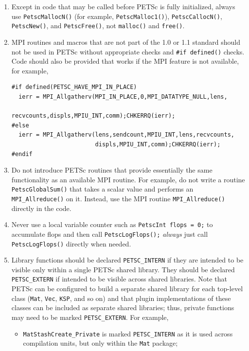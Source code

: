 \begin{enumerate}
\begin{lstlisting}
\end{lstlisting}
\item Except in code that may be called before PETSc is fully initialized, always use \lstinline{PetscMallocN()} (for example, \lstinline{PetscMalloc1()}), \lstinline{PetscCallocN()}, \lstinline{PetscNew()}, and \lstinline{PetscFree()}, not \lstinline{malloc()} and \lstinline{free()}.
\item MPI routines and macros that are not part of the 1.0 or 1.1 standard should not be used in PETSc without appropriate  checks and \lstinline{#if defined()} checks.
 Code should also be provided that works if the MPI feature is not available, for example,
\begin{lstlisting}
#if defined(PETSC_HAVE_MPI_IN_PLACE)
  ierr = MPI_Allgatherv(MPI_IN_PLACE,0,MPI_DATATYPE_NULL,lens,
                        recvcounts,displs,MPIU_INT,comm);CHKERRQ(ierr);
#else
  ierr = MPI_Allgatherv(lens,sendcount,MPIU_INT,lens,recvcounts,
                        displs,MPIU_INT,comm);CHKERRQ(ierr);
#endif
\end{lstlisting}
\item Do not introduce PETSc routines that provide essentially the same functionality as an available MPI routine.
  For example, do not write a routine \lstinline{PetscGlobalSum()} that takes a scalar value and performs an \lstinline{MPI_Allreduce()} on it.
  Instead, use the MPI routine \lstinline{MPI_Allreduce()} directly in the code.
\item Never use a local variable counter such as \lstinline{PetscInt flops = 0;} to accumulate flops and then call \lstinline{PetscLogFlops();} {\em always} just
  call \lstinline{PetscLogFlops()} directly when needed.
\item \label{styleitem:petscextern} Library functions should be declared \lstinline{PETSC_INTERN} if they are intended to be visible only within a single PETSc shared library.
They should be declared \lstinline{PETSC_EXTERN} if intended to be visible across shared libraries.
Note that PETSc can be configured to build a separate shared library for each top-level class (\lstinline{Mat}, \lstinline{Vec}, \lstinline{KSP}, and so on) and that plugin implementations of these classes can be included as separate shared libraries; thus, private functions may need to be marked \lstinline{PETSC_EXTERN}.
For example,
\begin{itemize}
\item \lstinline{MatStashCreate_Private} is marked \lstinline{PETSC_INTERN} as it is used across compilation units, but only within the \lstinline{Mat} package;

\end{itemize}
\end{enumerate}
